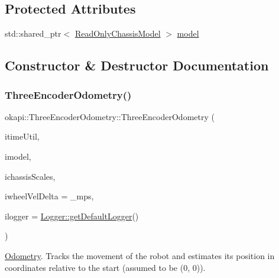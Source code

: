 \subsection*{Protected Attributes}
\begin{DoxyCompactItemize}
\item 
std\+::shared\+\_\+ptr$<$ \mbox{\hyperlink{classokapi_1_1ReadOnlyChassisModel}{Read\+Only\+Chassis\+Model}} $>$ \mbox{\hyperlink{classokapi_1_1ThreeEncoderOdometry_ad2a5ed5af817d5d2cc6e49357fe6f1da}{model}}
\end{DoxyCompactItemize}


\subsection{Constructor \& Destructor Documentation}
\mbox{\label{classokapi_1_1ThreeEncoderOdometry_ad65a58475f76fbfa90207b39e02d96dc}} 
\subsubsection{\texorpdfstring{ThreeEncoderOdometry()}{ThreeEncoderOdometry()}}
{\footnotesize\ttfamily okapi\+::\+Three\+Encoder\+Odometry\+::\+Three\+Encoder\+Odometry (\begin{DoxyParamCaption}\item[{const \mbox{\hyperlink{classokapi_1_1TimeUtil}{Time\+Util}} \&}]{itime\+Util,  }\item[{std\+::shared\+\_\+ptr$<$ \mbox{\hyperlink{classokapi_1_1ReadOnlyChassisModel}{Read\+Only\+Chassis\+Model}} $>$}]{imodel,  }\item[{const \mbox{\hyperlink{classokapi_1_1ChassisScales}{Chassis\+Scales}} \&}]{ichassis\+Scales,  }\item[{const Q\+Speed \&}]{iwheel\+Vel\+Delta = {\+\_\+mps},  }\item[{const std\+::shared\+\_\+ptr$<$ \mbox{\hyperlink{classokapi_1_1Logger}{Logger}} $>$ \&}]{ilogger = {\ttfamily \mbox{\hyperlink{classokapi_1_1Logger_a5053cf778b4b55acba788a3797dc96d2}{Logger\+::get\+Default\+Logger}}()} }\end{DoxyParamCaption})}

\mbox{\hyperlink{classokapi_1_1Odometry}{Odometry}}. Tracks the movement of the robot and estimates its position in coordinates relative to the start (assumed to be (0, 0)).


